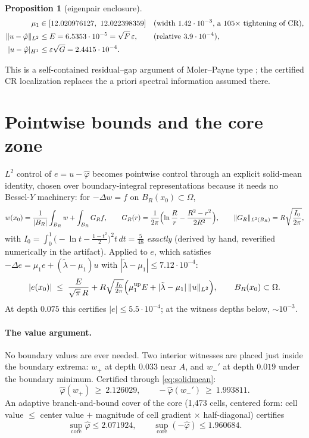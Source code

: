 \documentclass[11pt]{article}
\newtheorem{proposition}{Proposition}
\newcommand{\norm}[1]{\lVert #1 \rVert}
\newcommand{\lam}{\tilde\lambda}
\newcommand{\phih}{\hat\varphi}
\begin{document}
\begin{proposition}[eigenpair enclosure]\label{prop:eigenpair}
\begin{align}
\mu_1 &\in [12.020976127,\ 12.022398359]
&&\text{(width $1.42\cdot10^{-3}$, a $105\times$ tightening of CR)},
\notag\\
\norm{u-\phih}_{L^2} &\le E = 6.5353\cdot10^{-5}
= \sqrt{F}\,\varepsilon,
&&\text{(relative $3.9\cdot10^{-4}$)},
\notag\\
|u-\phih|_{H^1} &\le \varepsilon\sqrt{G} = 2.4415\cdot10^{-4}.
\notag
\end{align}
\end{proposition}

This is a self-contained residual--gap argument of Moler--Payne type
\cite{MolerPayne}; the certified CR localization replaces the a priori
spectral information assumed there.

\section{Pointwise bounds and the core zone}\label{sec:core}

$L^2$ control of $e=u-\phih$ becomes pointwise control through an
explicit solid-mean identity, chosen over boundary-integral
representations because it needs no Bessel-$Y$ machinery: for
$-\Delta w=f$ on $B_R(x_0)\subset\Omega$,
\[
w(x_0)=\frac{1}{|B_R|}\int_{B_R} w+\int_{B_R}G_R f,\qquad
G_R(r)=\frac{1}{2\pi}\Bigl(\ln\frac{R}{r}-\frac{R^2-r^2}{2R^2}\Bigr),\qquad
\norm{G_R}_{L^2(B_R)}=R\sqrt{\frac{I_0}{2\pi}},
\]
with $I_0=\int_0^1\bigl(-\ln t-\tfrac{1-t^2}{2}\bigr)^2 t\,dt =
\frac{5}{48}$ \emph{exactly} (derived by hand, reverified numerically in
the artifact). Applied to $e$, which satisfies
$-\Delta e=\mu_1e+(\lam-\mu_1)u$ with $|\lam-\mu_1|\le 7.12\cdot10^{-4}$:
\begin{equation}\label{eq:solidmean}
|e(x_0)| \;\le\; \frac{E}{\sqrt{\pi}\,R}
+ R\sqrt{\tfrac{I_0}{2\pi}}\Bigl(\mu_1^{\mathrm{up}}E
+ |\lam-\mu_1|\,\norm{u}_{L^2}\Bigr),
\qquad B_R(x_0)\subset\Omega .
\end{equation}
At depth $0.075$ this certifies $|e|\le 5.5\cdot10^{-4}$; at the witness
depths below, ${\sim}10^{-3}$.

\paragraph{The value argument.}
No boundary values are ever needed. Two interior witnesses are placed
just inside the boundary extrema: $w_+$ at depth $0.033$ near $A$, and
$w_-'$ at depth $0.019$ under the boundary minimum. Certified through
\eqref{eq:solidmean}:
\[
\phih(w_+)\ \ge\ 2.126029, \qquad -\phih(w_-')\ \ge\ 1.993811 .
\]
An adaptive branch-and-bound cover of the core (1{,}473 cells, centered
form: cell value $\le$ center value $+$ magnitude of cell gradient
$\times$ half-diagonal) certifies
\[
\sup_{\mathrm{core}}\phih \le 2.071924, \qquad
\sup_{\mathrm{core}}(-\phih) \le 1.960684 .
\]
\end{document}
